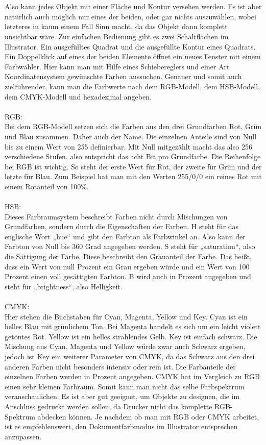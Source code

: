 \leavevmode \\
\leavevmode \\
Also kann jedes Objekt mit einer Fläche und Kontur versehen werden. Es ist aber natürlich auch möglich nur eines der beiden, oder gar nichts auszuwählen, wobei letzteres in kaum einem Fall Sinn macht, da das Objekt dann komplett unsichtbar wäre. Zur einfachen Bedienung gibt es zwei Schaltflächen im Illustrator. Ein ausgefülltes Quadrat und die ausgefüllte Kontur eines Quadrats. Ein Doppelklick auf eines der beiden Elemente öffnet ein neues Fenster mit einem Farbwähler. Hier kann man mit Hilfe eines Schiebereglers und einer Art Koordinatensystem gewünschte Farben aussuchen. Genauer und somit auch zielführender, kann man die Farbwerte nach dem RGB-Modell, dem HSB-Modell, dem CMYK-Modell und hexadezimal angeben.\cite{farbselect}
\leavevmode \\
\leavevmode \\
RGB:
\leavevmode \\
Bei dem RGB-Modell setzen sich die Farben aus den drei Grundfarben Rot, Grün und Blau zusammen. Daher auch der Name. Die einzelnen Anteile sind von Null bis zu einem Wert von 255 definierbar. Mit Null mitgezählt macht das also 256 verschiedene Stufen, also entspricht das acht Bit pro Grundfarbe. Die Reihenfolge bei RGB ist wichtig. So steht der erste Wert für Rot, der zweite für Grün und der letzte für Blau. Zum Beispiel hat man mit den Werten 255/0/0 ein reines Rot mit einem Rotanteil von 100\%.\cite{rgb}
\leavevmode \\
\leavevmode \\
HSB:
\leavevmode \\
Dieses Farbraumsystem beschreibt Farben nicht durch Mischungen von Grundfarben, sondern durch die Eigenschaften der Farben. H steht für das englische Wort „hue“ und gibt den Farbton als Farbwinkel an. Also kann der Farbton von Null bis 360 Grad angegeben werden. S steht für „saturation“, also die Sättigung der Farbe. Diese beschreibt den Grauanteil der Farbe. Das heißt, dass ein Wert von null Prozent ein Grau ergeben würde und ein Wert von 100 Prozent einen voll gesättigten Farbton. B wird auch in Prozent angegeben und steht für „brightness“, also Helligkeit.\cite{hsb}\cite{hsbzwei}
\leavevmode \\
\leavevmode \\
CMYK:
\leavevmode \\
Hier stehen die Buchstaben für Cyan, Magenta, Yellow und Key. Cyan ist ein helles Blau mit grünlichem Ton. Bei Magenta handelt es sich um ein leicht violett getöntes Rot. Yellow ist ein helles strahlendes Gelb. Key ist einfach schwarz. Die Mischung aus Cyan, Magenta und Yellow würde zwar auch Schwarz ergeben, jedoch ist Key ein weiterer Parameter von CMYK, da das Schwarz aus den drei anderen Farben nicht besonders intensiv oder rein ist. Die Farbanteile der einzelnen Farben werden in Prozent angegeben. CMYK hat im Vergleich zu RGB einen sehr kleinen Farbraum. Somit kann man nicht das selbe Farbspektrum veranschaulichen. Es ist aber gut geeignet, um Objekte zu designen, die im Anschluss gedruckt werden sollen, da Drucker nicht das komplette RGB-Spektrum abdecken können. Je nachdem ob man mit RGB oder CMYK arbeitet, ist es empfehlenswert, den Dokumentfarbmodus im Illustrator entsprechen anzupassen.\cite{cmyk}

